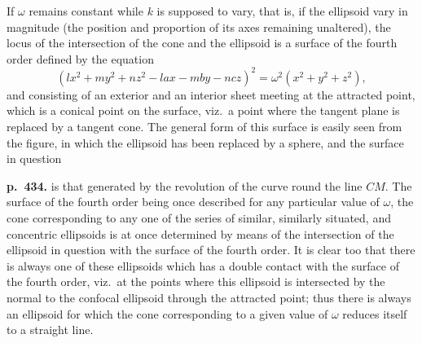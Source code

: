\documentclass[11pt]{article}
\begin{document}
If $\omega$ remains constant while $k$ is supposed to vary, that is, if the ellipsoid vary in magnitude (the position and proportion of its axes remaining unaltered), the locus of the intersection of the cone and the ellipsoid is a surface of the fourth order defined by the equation
\[ (lx^2 + my^2 + nz^2 - lax - mby - ncz)^2 = \omega^2(x^2 + y^2 + z^2), \]
and consisting of an exterior and an interior sheet meeting at the attracted point, which is a conical point on the surface, viz.\ a point where the tangent plane is replaced by a tangent cone. The general form of this surface is easily seen from the figure, in which the ellipsoid has been replaced by a sphere, and the surface in question

\begin{center}
\end{center}

\noindent\textbf{p.~434.} is that generated by the revolution of the curve round the line $CM$. The surface of the fourth order being once described for any particular value of $\omega$, the cone corresponding to any one of the series of similar, similarly situated, and concentric ellipsoids is at once determined by means of the intersection of the ellipsoid in question with the surface of the fourth order. It is clear too that there is always one of these ellipsoids which has a double contact with the surface of the fourth order, viz.\ at the points where this ellipsoid is intersected by the normal to the confocal ellipsoid through the attracted point; thus there is always an ellipsoid for which the cone corresponding to a given value of $\omega$ reduces itself to a straight line.
\end{document}
